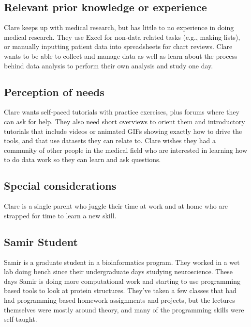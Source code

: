 \documentclass[../main.tex]{subfiles}
\begin{document}
            \subsection{Relevant prior knowledge or experience}

                Clare keeps up with medical research,
                but has little to no experience in doing medical research.
                They use Excel for non-data related tasks (e.g., making lists),
                or manually inputting patient data into spreadsheets for chart reviews.
                Clare wants to be able to collect and manage data as well as
                learn about the process behind data analysis to perform their own analysis and study one day.

            \subsection{Perception of needs}

                Clare wants self-paced tutorials with practice exercises,
                plus forums where they can ask for help.
                They also need short overviews to orient them and
                introductory tutorials that include videos or animated GIFs showing exactly how to drive the tools,
                and that use datasets they can relate to.
                Clare wishes they had a community of other people in
                the medical field who are interested in learning how to do data work so they can learn and ask questions.

            \subsection{Special considerations}

                Clare is a single parent who juggle their time at work and at home who are strapped for time to learn a new skill.

        \subsection{Samir Student}

            Samir is a graduate student in a bioinformatics program.
            They worked in a wet lab doing bench since their undergraduate days studying neuroscience.
            These days Samir is doing more computational work and
            starting to use programming based tools to look at protein structures.
            They’ve taken a few classes that had had programming based homework assignments and projects,
            but the lectures themselves were mostly around theory, and many of the programming skills were self-taught.
\end{document}
